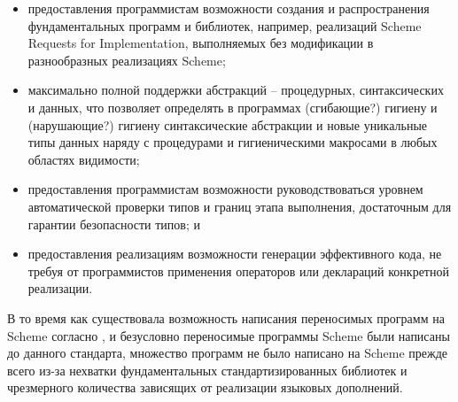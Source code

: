 \begin{itemize}
\item предоставления программистам возможности создания и распространения фундаментальных
  программ и библиотек, например, реализаций Scheme Requests for Implementation, выполняемых без
  модификации в разнообразных реализациях Scheme;\vspace{-1.2mm}

\item максимально полной поддержки абстракций -- процедурных, синтаксических и данных, что
  позволяет определять в программах (сгибающие?) гигиену и (нарушающие?) гигиену синтаксические
  абстракции и новые уникальные типы данных наряду с процедурами и гигиеническими макросами в
  любых областях видимости;\vspace{-1.2mm}

\item предоставления программистам возможности руководствоваться уровнем
  автоматической проверки типов и границ этапа выполнения,
  достаточным для гарантии безопасности типов; и\vspace{-1.2mm}

\item предоставления реализациям возможности генерации эффективного кода, не требуя от
  программистов применения операторов или деклараций конкретной реализации.

\end{itemize}\vspace{-1.2mm}

В то время как существовала возможность написания переносимых программ на Scheme согласно
, и безусловно переносимые программы Scheme были написаны до данного стандарта, множество
программ не было написано на Scheme прежде всего из-за нехватки фундаментальных
стандартизированных библиотек и чрезмерного количества зависящих от реализации языковых
дополнений.

